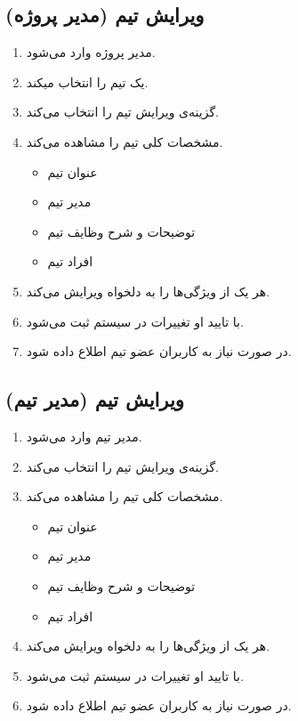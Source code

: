 \documentclass[10pt,a4paper]{article}
\begin{document}
\subsection{
ویرایش تیم (مدیر پروژه)
}

\begin{enumerate}
	\item 
	مدیر پروژه وارد می‌شود.
	\item
	یک تیم را انتخاب میکند.
	\item
	گزینه‌ی ویرایش تیم را انتخاب می‌کند.
	\item
	مشخصات کلی تیم را مشاهده می‌کند.
	\begin{itemize}
		\item 
		عنوان تیم 
		\item
		مدیر تیم
		\item
		توضیحات و شرح وظایف تیم
		\item
		افراد تیم 
	\end{itemize}
\item
هر یک از ويژگی‌ها را به دلخواه ویرایش می‌کند.
\item
با تایید او تغییرات در سیستم ثبت می‌شود.
\item
در صورت نیاز به کاربران عضو تیم اطلاع داده شود.
	
\end{enumerate}


\subsection{
	ویرایش تیم (مدیر تیم)
}

\begin{enumerate}
	\item 
    مدیر تیم وارد می‌شود.
	\item
	گزینه‌ی ویرایش تیم را انتخاب می‌کند.
	\item
	مشخصات کلی تیم را مشاهده می‌کند.
	\begin{itemize}
		\item 
		عنوان تیم 
		\item
		مدیر تیم
		\item
		توضیحات و شرح وظایف تیم
		\item
		افراد تیم 
	\end{itemize}
	\item
	هر یک از ويژگی‌ها را به دلخواه ویرایش می‌کند.
	\item
	با تایید او تغییرات در سیستم ثبت می‌شود.
	\item
	در صورت نیاز به کاربران عضو تیم اطلاع داده شود.
	
\end{enumerate}
\end{document}
